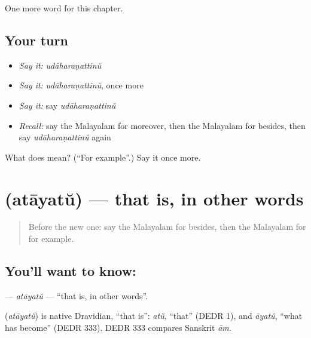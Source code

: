 \begin{grammarlens}[title={What you've built}]
One more word for this chapter.
\end{grammarlens}

\subsection*{Your turn}
\begin{itemize}
\raggedright
  \item \emph{Say it:} \emph{udāharaṇattinŭ}
  \item \emph{Say it:} \emph{udāharaṇattinŭ}, once more
  \item \emph{Say it:} say \emph{udāharaṇattinŭ}
  \item \emph{Recall:} say the Malayalam for moreover, then the Malayalam for besides, then say \emph{udāharaṇattinŭ} again
\end{itemize}

\begin{tcolorbox}[breakable,colback=teal!4,colframe=teal!35!black,title={Before you move on}]
What does  mean? (\textquotedblleft{}For example\textquotedblright{}.) Say it once more.
\end{tcolorbox}
\section[\texorpdfstring{\ml{അതായത്} (atāyatŭ)}{അതായത് (atāyatŭ)}]{ (atāyatŭ) — that is, in other words}

\label{lesson:ML-C281-atayatu}



\begin{quote}
Before the new one: say the Malayalam for besides, then the Malayalam for for example.
\end{quote}

\subsection*{You'll want to know: }
\textbf{} — \emph{atāyatŭ} — \textquotedblleft{}that is, in other words\textquotedblright{}.

\begin{cousinweb}
\textbf{} (\emph{atāyatŭ}) is native Dravidian, \textquotedblleft{}that is\textquotedblright{}: \emph{atŭ}, \textquotedblleft{}that\textquotedblright{} (DEDR 1), and \emph{āyatŭ}, \textquotedblleft{}what has become\textquotedblright{} (DEDR 333). DEDR 333 compares Sanskrit \emph{ām}.
\end{cousinweb}


